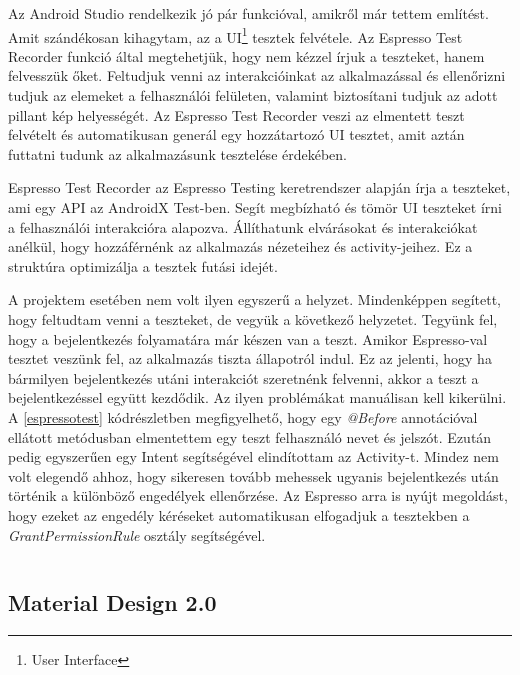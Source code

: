 \documentclass{thesis-ekf}
\theoremstyle{definition}
\theoremstyle{remark}
\begin{document}
Az Android Studio rendelkezik jó pár funkcióval, amikről már tettem említést.
Amit szándékosan kihagytam, az a UI\footnote{User Interface} tesztek felvétele.
Az Espresso Test Recorder funkció által megtehetjük, hogy nem kézzel írjuk a teszteket, hanem felvesszük őket.
Feltudjuk venni az interakcióinkat az alkalmazással és ellenőrizni tudjuk az elemeket a felhasználói felületen, valamint biztosítani tudjuk az adott pillant kép helyességét.
Az Espresso Test Recorder veszi az elmentett teszt felvételt és automatikusan generál egy hozzátartozó UI tesztet, amit aztán futtatni tudunk az alkalmazásunk tesztelése érdekében.

Espresso Test Recorder az Espresso Testing keretrendszer alapján írja a teszteket, ami egy API az AndroidX Test-ben.
Segít megbízható és tömör UI teszteket írni a felhasználói interakcióra alapozva.
Állíthatunk elvárásokat és interakciókat anélkül, hogy hozzáférnénk az alkalmazás nézeteihez és activity-jeihez.
Ez a struktúra optimizálja a tesztek futási idejét. \cite{espresso}

A projektem esetében nem volt ilyen egyszerű a helyzet.
Mindenképpen segített, hogy feltudtam venni a teszteket, de vegyük a következő helyzetet.
Tegyünk fel, hogy a bejelentkezés folyamatára már készen van a teszt.
Amikor Espresso-val tesztet veszünk fel, az alkalmazás tiszta állapotról indul.
Ez az jelenti, hogy ha bármilyen bejelentkezés utáni interakciót szeretnénk felvenni, akkor a teszt a bejelentkezéssel együtt kezdődik.
Az ilyen problémákat manuálisan kell kikerülni.
A \ref{espressotest} kódrészletben megfigyelhető, hogy egy \emph{@Before} annotációval ellátott metódusban elmentettem egy teszt felhasználó nevet és jelszót.
Ezután pedig egyszerűen egy Intent segítségével elindítottam az Activity-t.
Mindez nem volt elegendő ahhoz, hogy sikeresen tovább mehessek ugyanis bejelentkezés után történik a különböző engedélyek ellenőrzése.
Az Espresso arra is nyújt megoldást, hogy ezeket az engedély kéréseket automatikusan elfogadjuk a tesztekben a \emph{GrantPermissionRule} osztály segítségével.

\inputminted[linenos=true, breaklines]{java}{./codes/test.java}

\subsection{Material Design 2.0}
\end{document}
